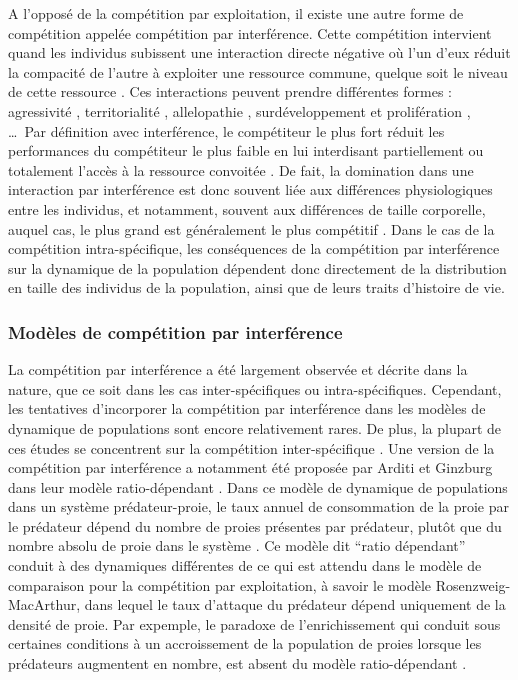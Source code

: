A l'opposé de la compétition par exploitation, il existe une autre forme de
compétition appelée compétition par interférence. Cette compétition intervient
quand les individus subissent une interaction directe négative où l'un d'eux
réduit la compacité de l'autre à exploiter une ressource commune, quelque soit
le niveau de cette ressource \autocites{park1954a,vance1984a}. Ces interactions
peuvent prendre différentes formes : agressivité \autocites{schoener1976a},
territorialité \autocites{walls1990a,kennedy1996a}, allelopathie
\autocites{harper1977a,rice1984a,nilsson1994a}, surdéveloppement et prolifération
\autocites{connell1961a,paine1966a}, \ldots~Par définition avec interférence, le
compétiteur le plus fort réduit les performances du compétiteur
le plus faible en lui interdisant
partiellement ou totalement l'accès à la ressource convoitée
\autocites{schoener1983a, thompson1993a}. De fait, la domination dans une
interaction par interférence est donc souvent liée aux différences
physiologiques entre les individus, et notamment, souvent aux différences de
taille corporelle, auquel cas, le plus grand est généralement le plus
compétitif \autocites{mccormick2012a}. Dans le cas de la compétition
intra-spécifique, les conséquences de la compétition par interférence sur la
dynamique de la population dépendent donc directement de la distribution en
taille des individus de la population, ainsi que de leurs traits d'histoire de
vie. 

\subsubsection{Modèles de compétition par interférence}

La compétition par interférence a été largement observée et décrite dans la
nature, que ce soit dans les cas inter-spécifiques ou intra-spécifiques.
Cependant, les tentatives d'incorporer la compétition par interférence dans les
modèles de dynamique de populations sont encore relativement rares. De plus, la
plupart de ces études se concentrent sur la compétition inter-spécifique
\autocites{case1974a, carothers1984a, vance1984a, adler2000a}. Une version de la
compétition par interférence a notamment été proposée par Arditi et Ginzburg
dans leur modèle ratio-dépendant \autocites{arditi1989a,arditi2012a,arditi1991a}.
Dans ce modèle de dynamique de populations dans un système prédateur-proie, le
taux annuel de consommation de la proie par le prédateur dépend du nombre de
proies présentes par prédateur, plutôt que du nombre absolu de proie dans le
système \autocite[voir][pour les détails et dérivations du modèle]{arditi2012a}.
Ce modèle dit ``ratio dépendant'' conduit à des dynamiques différentes de ce qui
est attendu dans le modèle de comparaison pour la compétition par exploitation,
à savoir le modèle Rosenzweig-MacArthur, dans lequel le taux d'attaque du
prédateur dépend uniquement de la densité de proie. Par expemple, le paradoxe de
l'enrichissement qui conduit sous certaines conditions à un accroissement de la
population de proies lorsque les prédateurs augmentent en nombre, est absent du
modèle ratio-dépendant \autocites{arditi2012a}. 

